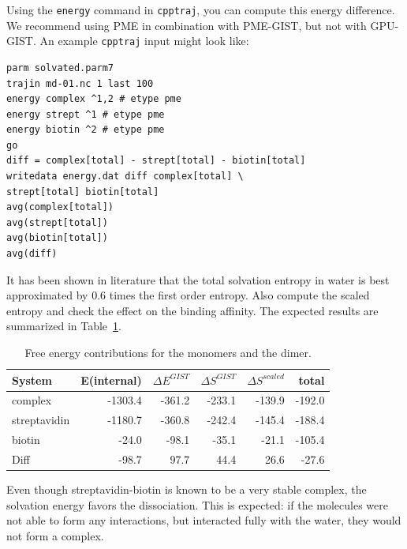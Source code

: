 \documentclass[9pt,tutorial]{livecoms}
\newcommand{\software}{\texttt}
\newcommand{\todo}{\textcolor{red}}
\newcommand\inlinecode{\texttt}
\begin{document}
Using the \inlinecode{energy} command in \software{cpptraj}, you can compute this energy difference.
We recommend using PME in combination with PME-GIST, but not with GPU-GIST\@.
An example \software{cpptraj} input might look like:
\begin{lstlisting}
parm solvated.parm7
trajin md-01.nc 1 last 100
energy complex ^1,2 # etype pme
energy strept ^1 # etype pme
energy biotin ^2 # etype pme
go
diff = complex[total] - strept[total] - biotin[total]
writedata energy.dat diff complex[total] \
strept[total] biotin[total]
avg(complex[total])
avg(strept[total])
avg(biotin[total])
avg(diff)
\end{lstlisting}

It has been shown in literature \cite{Chen2021,Waibl2022-gist-solvents} that the total solvation entropy in water is best approximated by 0.6 times the first order entropy.
Also compute the scaled entropy and check the effect on the binding affinity.
The expected results are summarized in Table~\ref{tab_dg_monomers_dimer}.
\begin{table}[h]
	\caption{Free energy contributions for the monomers and the dimer.}\label{tab_dg_monomers_dimer}
	\small
	\begin{tabular}{lrrrrr}
		\toprule
		System       & E(internal) & $\Delta E^\textit{GIST}$ & $\Delta S^\textit{GIST}$ & $\Delta S^\textit{scaled}$ & total \\
		\midrule
		complex      & -1303.4 & -361.2 & -233.1 & -139.9 & -192.0 \\
		streptavidin & -1180.7 & -360.8 & -242.4 & -145.4 & -188.4 \\
		biotin       & -24.0   &  -98.1 &  -35.1 &  -21.1 & -105.4 \\
		Diff         & -98.7   &   97.7 &   44.4 &   26.6 &  -27.6 \\
		\bottomrule
	\end{tabular}
\end{table}

Even though streptavidin-biotin is known to be a very stable complex, the solvation energy favors the dissociation.
This is expected: if the molecules were not able to form any interactions, but interacted fully with the water, they would not form a complex.
\end{document}
